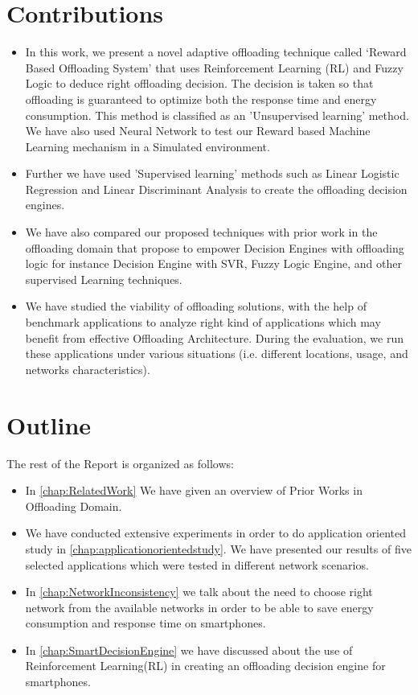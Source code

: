 \documentclass{report}
\begin{document}
\section{Contributions}
\begin{itemize} 

\item In this work, we present a novel adaptive offloading technique called ‘Reward Based Offloading System’ that uses Reinforcement Learning (RL) and Fuzzy Logic to deduce right offloading decision. The decision is taken so that offloading is guaranteed to optimize both the response time and energy consumption. This method is classified as an 'Unsupervised learning' method. We have also used Neural Network to test our Reward based Machine Learning mechanism in a Simulated environment.
\item Further we have used 'Supervised learning' methods such as Linear Logistic Regression and Linear Discriminant Analysis to create the offloading decision engines. 
\item We have also compared our proposed techniques with prior work in the offloading domain that propose to empower Decision Engines with offloading logic for instance Decision Engine with SVR, Fuzzy Logic Engine, and other supervised Learning techniques.
\item We have studied the viability of offloading solutions, with the help of benchmark applications to analyze right kind of applications which may benefit from effective Offloading Architecture. During the evaluation, we run these applications under various situations (i.e. different locations, usage, and networks characteristics).


\end{itemize}
\section{Outline}
The rest of the Report is organized as follows:
\begin{itemize}
	
	
	\item In \autoref{chap:RelatedWork} We have given an overview of Prior Works in Offloading Domain.
	\item We have conducted extensive experiments in order to do application oriented study in \autoref{chap:applicationorientedstudy}. We have presented our results of five selected applications which were tested in different network scenarios. 
	\item In \autoref{chap:NetworkInconsistency} we talk about the need to choose right network from the available networks in order to be able to save energy consumption and response time on smartphones.
	\item In \autoref{chap:SmartDecisionEngine} we have discussed about the use of Reinforcement Learning(RL) in creating an offloading decision engine for smartphones.
	

\end{itemize}
\end{document}
